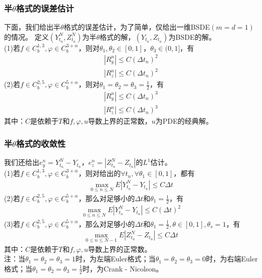 		\subsubsection{半$\theta$格式的误差估计}
			\par
			下面，我们给出半$\theta$格式的误差估计，为了简单，仅给出一维BSDE$(m=d=1)$的情况。
			定义$(Y_{t_n}^N,Z_{t_n}^N)$为半$\theta$格式的解，$(Y_{t_n},Z_{t_n})$为BSDE的解。\\
			\noindent (1)若$f \in C_b^{1,3},\varphi \in C_b^{3+\alpha}$，则对$\theta_1,\theta_2 \in [0,1]$，$\theta_3 \in (0,1]$，有
					\begin{align*}
					{\left| {R_y^n} \right| \leqslant C{{\left( {\Delta {t_n}} \right)}^2}}\\
					{\left| {R_z^n} \right| \leqslant C{{\left( {\Delta {t_n}} \right)}^2}}
					\end{align*}
			 \noindent (2)若$f \in C_b^{2,5},\varphi \in C_b^{5+\alpha}$，则对$\theta_1=\theta_2 =\theta_3 =\frac 12$，有
					\begin{align*}
					{\left| {R_y^n} \right| \leqslant C{{\left( {\Delta {t_n}} \right)}^3}}\\
					{\left| {R_z^n} \right| \leqslant C{{\left( {\Delta {t_n}} \right)}^3}}
					\end{align*}
			 其中：$C$是依赖于$T$和$f,\varphi,u$导数上界的正常数，$u$为PDE的经典解。%
		\subsubsection{半$\theta$格式的收敛性}
			我们还给出$e_y^n=Y_{t_n}^N-Y_{t_n}$，$e_z^n=|{Z_{t_n}^N}-{Z_{t_n}}|$的$L^{1}$估计。\\
			\noindent (1)若$f \in C_b^{1,3},\varphi \in C_b^{3+\alpha}$，则对给出的$\forall t_n,\forall \theta_1\in [0,1]$，都有
			\begin{align*}
			\mathop {\max }\limits_{0 \leqslant n \leqslant N}E|Y_{t_n}^N-Y_{t_n}| \leqslant C\Delta {t} \end{align*}
			 \noindent (2)若$f \in C_b^{2,5},\varphi \in C_b^{5+\alpha}$，那么对足够小的$\Delta {t}$和$\theta_1=\frac 12$，有
			\begin{align*}
			{\mathop {\max }\limits_{0 \leqslant n \leqslant N}}E|Y_{t_n}^N-Y_{t_n}| \leqslant C(\Delta {t})^2 \end{align*}
			 \noindent (3)若$f \in C_b^{2,5},\varphi \in C_b^{5+\alpha}$，那么对足够小的$\Delta {t}$和$\theta_1=\frac 12,\theta \in [0,1],\theta_s=1$，有
			\begin{align*}
			\mathop {\max }\limits_{0 \leqslant n \leqslant {N-1}}E|Z_{t_n}^N-Z_{t_n}| \leqslant C\Delta {t} \end{align*}
			其中：$C$是依赖于$T$和$f,\varphi,u$导数上界的正常数。\\
			注：当$\theta_1 = \theta_2 = \theta_3 = 1$时，为左端Euler格式；当$\theta_1 = \theta_2 = \theta_3 = 0$时，为右端Euler格式；当$\theta_1 = \theta_2 = \theta_3 = \frac{1}{2}$时，为Crank - Nicolson。
